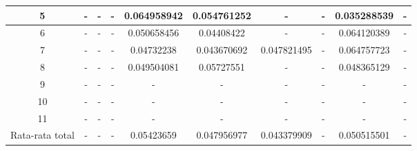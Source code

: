 \begin{table}[H]
{\begin{tabular}{|c|ccccccccc|}
			5 & \multicolumn{1}{c|}{-} & \multicolumn{1}{c|}{-} & \multicolumn{1}{c|}{-} & \multicolumn{1}{c|}{0.064958942} & \multicolumn{1}{c|}{0.054761252} & \multicolumn{1}{c|}{-} & \multicolumn{1}{c|}{-} & \multicolumn{1}{c|}{0.035288539} & - \\ \hline
			6 & \multicolumn{1}{c|}{-} & \multicolumn{1}{c|}{-} & \multicolumn{1}{c|}{-} & \multicolumn{1}{c|}{0.050658456} & \multicolumn{1}{c|}{0.04408422} & \multicolumn{1}{c|}{-} & \multicolumn{1}{c|}{-} & \multicolumn{1}{c|}{0.064120389} & - \\ \hline
			7 & \multicolumn{1}{c|}{-} & \multicolumn{1}{c|}{-} & \multicolumn{1}{c|}{-} & \multicolumn{1}{c|}{0.04732238} & \multicolumn{1}{c|}{0.043670692} & \multicolumn{1}{c|}{0.047821495} & \multicolumn{1}{c|}{-} & \multicolumn{1}{c|}{0.064757723} & - \\ \hline
			8 & \multicolumn{1}{c|}{-} & \multicolumn{1}{c|}{-} & \multicolumn{1}{c|}{-} & \multicolumn{1}{c|}{0.049504081} & \multicolumn{1}{c|}{0.05727551} & \multicolumn{1}{c|}{-} & \multicolumn{1}{c|}{-} & \multicolumn{1}{c|}{0.048365129} & - \\ \hline
			9 & \multicolumn{1}{c|}{-} & \multicolumn{1}{c|}{-} & \multicolumn{1}{c|}{-} & \multicolumn{1}{c|}{-} & \multicolumn{1}{c|}{-} & \multicolumn{1}{c|}{-} & \multicolumn{1}{c|}{-} & \multicolumn{1}{c|}{-} & - \\ \hline
			10 & \multicolumn{1}{c|}{-} & \multicolumn{1}{c|}{-} & \multicolumn{1}{c|}{-} & \multicolumn{1}{c|}{-} & \multicolumn{1}{c|}{-} & \multicolumn{1}{c|}{-} & \multicolumn{1}{c|}{-} & \multicolumn{1}{c|}{-} & - \\ \hline
			11 & \multicolumn{1}{c|}{-} & \multicolumn{1}{c|}{-} & \multicolumn{1}{c|}{-} & \multicolumn{1}{c|}{-} & \multicolumn{1}{c|}{-} & \multicolumn{1}{c|}{-} & \multicolumn{1}{c|}{-} & \multicolumn{1}{c|}{-} & - \\ \hline
			Rata-rata total & \multicolumn{1}{c|}{-} & \multicolumn{1}{c|}{-} & \multicolumn{1}{c|}{-} & \multicolumn{1}{c|}{0.05423659} & \multicolumn{1}{c|}{0.047956977} & \multicolumn{1}{c|}{0.043379909} & \multicolumn{1}{c|}{-} & \multicolumn{1}{c|}{0.050515501} & - \\ \hline
		\end{tabular}%
	}
\end{table}

